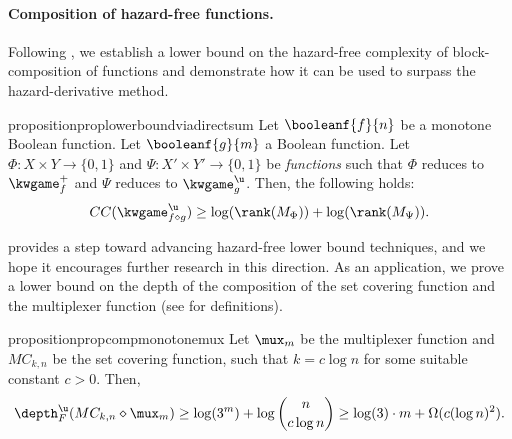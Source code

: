 \documentclass[acmsmall, nonacm, authorversion]{acmart}
\begin{document}
\paragraph{Composition of hazard-free functions.}
Following \cite{KRW95}, we establish a lower bound on the hazard-free complexity of block-composition of functions and demonstrate how it can be used to surpass the hazard-derivative method.
\begin{restatable}{proposition}{proplowerboundviadirectsum}\label{prop:lower-bound-direct-sum}
Let $\booleanf{f}{n}$ be a monotone Boolean function. Let $\booleanf{g}{m}$ a Boolean function. Let $\Phi:X\times Y \rightarrow \{0,1\}$ and $\Psi:X'\times Y'\rightarrow \{0,1\}$ be \emph{functions} such that $\Phi$ reduces to $\kwgame_f^{+}$ and $\Psi$ reduces to $\kwgame_g^\u$. Then, the following holds:
\[
CC(\kwgame^\u_{f\diamond g})\ge\log(\rank(M_\Phi))+\log(\rank(M_\Psi)).
\]
\end{restatable}

 provides a step toward advancing hazard-free lower bound techniques, and we hope it encourages further research in this direction. As an application, we prove a lower bound on the depth of the composition of the set covering function and the multiplexer function (see  for definitions).

\begin{restatable}{proposition}{propcompmonotonemux}
    \label{prop-intro:comp-monotone-mux}
Let $\mux_m$ be the multiplexer function and $MC_{k,n}$ be the set covering function, such that $k=c\log n$ for some suitable constant $c>0$. Then,
\[
\depth_{F}^\u(MC_{k,n} \diamond \mux_m) \ge \log(3^m)+\log\binom{n}{c \log n} \ge\log(3)\cdot m +\Omega(c(\log n)^2).
\]
\end{restatable}
\end{document}
